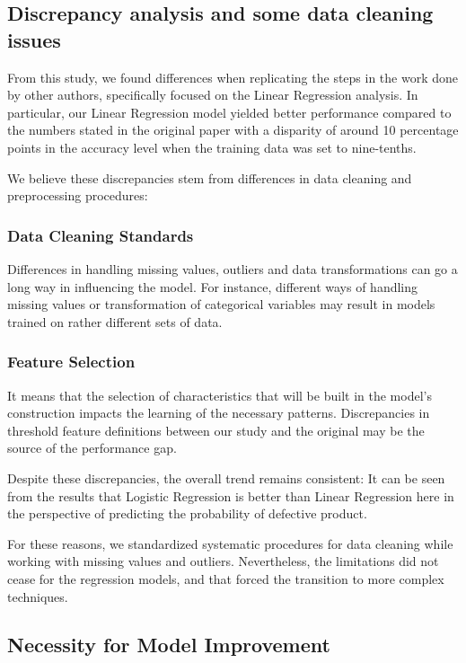 \documentclass[conference]{IEEEtran}
\begin{document}
\subsection{Discrepancy analysis and some data cleaning issues}

From this study, we found differences when replicating the steps in the work done by other authors, specifically focused on the Linear Regression analysis. In particular, our Linear Regression model yielded better performance compared to the numbers stated in the original paper with a disparity of around 10 percentage points in the accuracy level when the training data was set to nine-tenths.

We believe these discrepancies stem from differences in data cleaning and preprocessing procedures:

\subsubsection{Data Cleaning Standards}
Differences in handling missing values, outliers and data transformations can go a long way in influencing the model. For instance, different ways of handling missing values or transformation of categorical variables may result in models trained on rather different sets of data.


\subsubsection{Feature Selection}
It means that the selection of characteristics that will be built in the model’s construction impacts the learning of the necessary patterns. Discrepancies in threshold feature definitions between our study and the original may be the source of the performance gap.


Despite these discrepancies, the overall trend remains consistent: It can be seen from the results that Logistic Regression is better than Linear Regression here in the perspective of predicting the probability of defective product.

For these reasons, we standardized systematic procedures for data cleaning while working with missing values and outliers. Nevertheless, the limitations did not cease for the regression models, and that forced the transition to more complex techniques.

\subsection{Necessity for Model Improvement}
\end{document}
